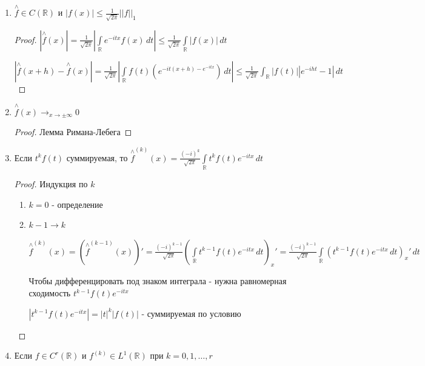 \begin{properties}
    \begin{enumerate}
        \item {
            $\overset{\wedge}{f} \in C (\mathbb{R})$ и $|f(x)| \leqslant \frac{1}{\sqrt{2\pi}} ||f||_1$

            \begin{proof}
                $|\overset{\wedge}{f}(x)| = \frac{1}{\sqrt{2\pi}} \left| \int\limits_{\mathbb{R}} e^{-itx} f(x) \, dt \right| \leqslant \frac{1}{\sqrt{2\pi}} \int\limits_{\mathbb{R}} |f(x)| \, dt$

                $\left| \overset{\wedge}{f} (x + h) - \overset{\wedge}{f} (x) \right| = \frac{1}{\sqrt{2\pi}} \left| \int\limits_{\mathbb{R}} f(t) (e^{-it(x + h) - e^{-itx}}) \, dt \right| \leqslant \frac{1}{\sqrt{2\pi}} \int_{\mathbb{R}} |f(t)| |e^{-iht} - 1| \, dt$
            \end{proof}

        }
        \item {
            $\overset{\wedge}{f} (x) \rightarrow_{x \to \pm \infty} 0$

            \begin{proof}
                Лемма Римана-Лебега
            \end{proof}
        }
        \item {
            Если $t^k f(t)$ суммируемая, то $\overset{\wedge}{f}^{(k)} (x) = \frac{(-i)^k}{\sqrt{2\pi}} \int\limits_{\mathbb{R}} t^k f(t) e^{-itx} \, dt$

            \begin{proof}
                Индукция по $k$

                \begin{enumerate}
                    \item $k = 0$ - определение
                    \item {
                        $k - 1 \rightarrow k$

                        $\overset{\wedge}{f}^{(k)} (x) = \left( \overset{\wedge}{f}^{(k - 1)} (x) \right)' = \frac{(-i)^{k - 1}}{\sqrt{2\pi}} \left( \int\limits_{\mathbb{R}} t^{k -1} f(t) e^{-itx} \, dt \right)_x' = \frac{(-i)^{k - 1}}{\sqrt{2\pi}} \int\limits_{\mathbb{R}} \left( t^{k-1} f(t) e^{-itx} \, dt \right)_x' \, dt$

                        Чтобы дифференцировать под знаком интеграла - нужна равномерная сходимость $t^{k-1} f(t) e^{-itx}$

                        $\left| t^{k-1} f(t) e^{-itx} \right| = |t|^k |f(t)|$ - суммируемая по условию
                    }
                \end{enumerate}
            \end{proof}
        }
        \item {
            Если $f \in C^r (\mathbb{R})$ и $f^{(k)} \in L^1 (\mathbb{R})$ при  $k = 0, 1, \ldots, r$

}
\end{enumerate}
\end{properties}
